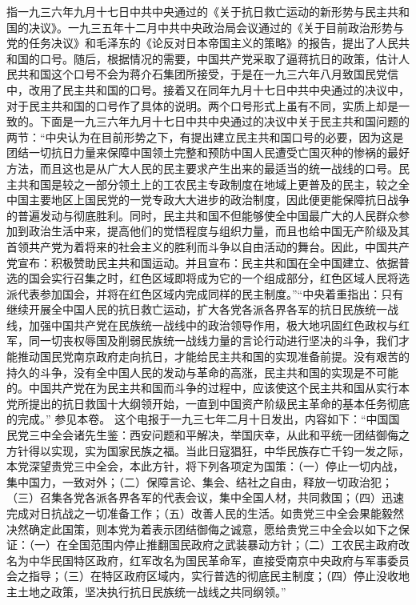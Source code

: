 \begin{maonote}
指一九三六年九月十七日中共中央通过的《关于抗日救亡运动的新形势与民主共和国的决议》。一九三五年十二月中共中央政治局会议通过的《关于目前政治形势与党的任务决议》和毛泽东的《论反对日本帝国主义的策略》的报告，提出了人民共和国的口号。随后，根据情况的需要，中国共产党采取了逼蒋抗日的政策，估计人民共和国这个口号不会为蒋介石集团所接受，于是在一九三六年八月致国民党信中，改用了民主共和国的口号。接着又在同年九月十七日中共中央通过的决议中，对于民主共和国的口号作了具体的说明。两个口号形式上虽有不同，实质上却是一致的。下面是一九三六年九月十七日中共中央通过的决议中关于民主共和国问题的两节：“中央认为在目前形势之下，有提出建立民主共和国口号的必要，因为这是团结一切抗日力量来保障中国领土完整和预防中国人民遭受亡国灭种的惨祸的最好方法，而且这也是从广大人民的民主要求产生出来的最适当的统一战线的口号。民主共和国是较之一部分领土上的工农民主专政制度在地域上更普及的民主，较之全中国主要地区上国民党的一党专政大大进步的政治制度，因此便更能保障抗日战争的普遍发动与彻底胜利。同时，民主共和国不但能够使全中国最广大的人民群众参加到政治生活中来，提高他们的觉悟程度与组织力量，而且也给中国无产阶级及其首领共产党为着将来的社会主义的胜利而斗争以自由活动的舞台。因此，中国共产党宣布：积极赞助民主共和国运动。并且宣布：民主共和国在全中国建立、依据普选的国会实行召集之时，红色区域即将成为它的一个组成部分，红色区域人民将选派代表参加国会，并将在红色区域内完成同样的民主制度。”“中央着重指出：只有继续开展全中国人民的抗日救亡运动，扩大各党各派各界各军的抗日民族统一战线，加强中国共产党在民族统一战线中的政治领导作用，极大地巩固红色政权与红军，同一切丧权辱国及削弱民族统一战线力量的言论行动进行坚决的斗争，我们才能推动国民党南京政府走向抗日，才能给民主共和国的实现准备前提。没有艰苦的持久的斗争，没有全中国人民的发动与革命的高涨，民主共和国的实现是不可能的。中国共产党在为民主共和国而斗争的过程中，应该使这个民主共和国从实行本党所提出的抗日救国十大纲领开始，一直到中国资产阶级民主革命的基本任务彻底的完成。”
参见本卷。
这个电报于一九三七年二月十日发出，内容如下：“中国国民党三中全会诸先生鉴：西安问题和平解决，举国庆幸，从此和平统一团结御侮之方针得以实现，实为国家民族之福。当此日寇猖狂，中华民族存亡千钧一发之际，本党深望贵党三中全会，本此方针，将下列各项定为国策：（一）停止一切内战，集中国力，一致对外；（二）保障言论、集会、结社之自由，释放一切政治犯；（三）召集各党各派各界各军的代表会议，集中全国人材，共同救国；（四）迅速完成对日抗战之一切准备工作；（五）改善人民的生活。如贵党三中全会果能毅然决然确定此国策，则本党为着表示团结御侮之诚意，愿给贵党三中全会以如下之保证：（一）在全国范围内停止推翻国民政府之武装暴动方针；（二）工农民主政府改名为中华民国特区政府，红军改名为国民革命军，直接受南京中央政府与军事委员会之指导；（三）在特区政府区域内，实行普选的彻底民主制度；（四）停止没收地主土地之政策，坚决执行抗日民族统一战线之共同纲领。”

\end{maonote}
